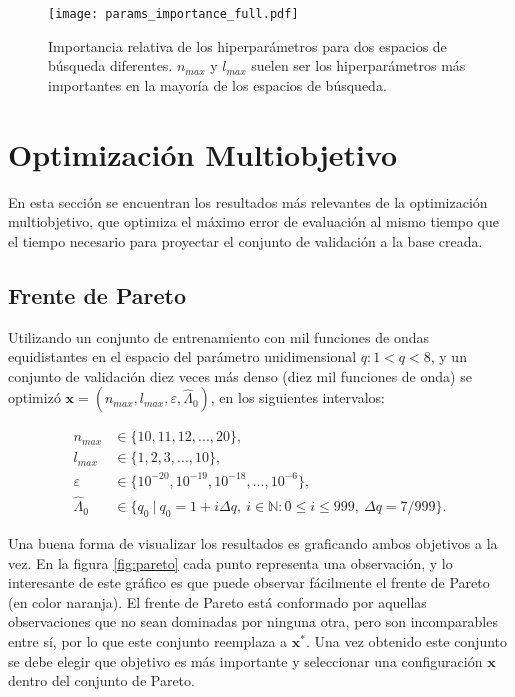 \begin{figure}[h!]
\centering
\texttt{[image: params\_importance\_full.pdf]}
\caption{Importancia relativa de los hiperparámetros para dos espacios de búsqueda diferentes. $n_{max}$ y $l_{max}$ suelen ser los hiperparámetros más importantes en la mayoría de los espacios de búsqueda.}
\label{fig:param_import}
\end{figure}



\newpage
\section{Optimización Multiobjetivo}

En esta sección se encuentran los resultados más relevantes de la optimización multiobjetivo, que optimiza el máximo error de evaluación al mismo tiempo que el tiempo necesario para proyectar el conjunto de validación a la base creada.


\subsection{Frente de Pareto}

Utilizando un conjunto de entrenamiento con mil funciones de ondas equidistantes en el espacio del parámetro unidimensional $q: 1 < q < 8$, y un conjunto de validación diez veces más denso (diez mil funciones de onda) se optimizó $\textbf{x} = (n_{max}, l_{max},\varepsilon, \hat{\Lambda}_0)$, en los siguientes intervalos:

\begin{align*}
n_{max} &\in \{10, 11, 12, ..., 20\},\\
l_{max} &\in \{1, 2, 3, ..., 10 \},\\
\varepsilon &\in \{  10^{-20}, 10^{-19}, 10^{-18}, ..., 10^{-6}\}, \\
\hat{\Lambda}_0 &\in \{q_0 \ | \ q_0 = 1 + i \Delta q, \ i\in \mathbb{N} : 0 \le i \le 999, \ \Delta q = 7/999 \}.
\end{align*}

Una buena forma de visualizar los resultados es graficando ambos objetivos a la vez. En la figura \ref{fig:pareto} cada punto representa una observación, y lo interesante de este gráfico es que puede observar fácilmente el frente de Pareto (en color naranja). El frente de Pareto está conformado por aquellas observaciones que no sean dominadas por ninguna otra, pero son incomparables entre sí, por lo que este conjunto reemplaza a $\textbf{x}^*$. Una vez obtenido este conjunto se debe elegir que objetivo es más importante y seleccionar una configuración $\textbf{x}$ dentro del conjunto de Pareto.

